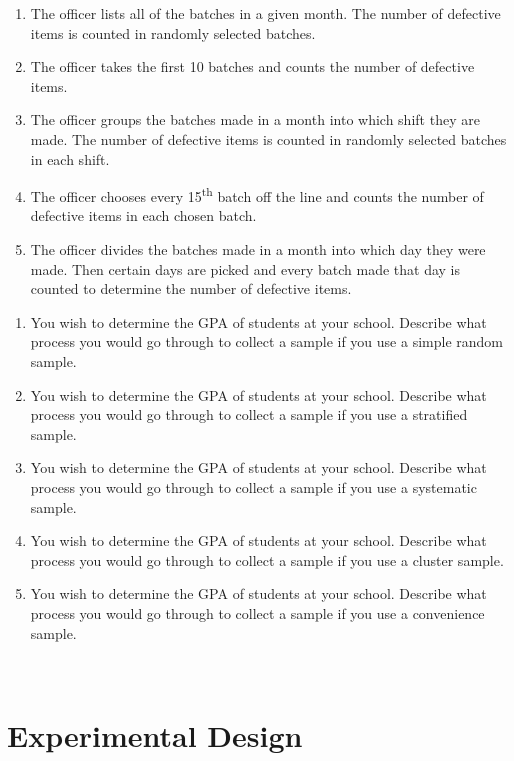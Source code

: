 \documentclass[]{book}
\providecommand{\tightlist}{%
  \setlength{\itemsep}{0pt}\setlength{\parskip}{0pt}}
\begin{document}
\begin{enumerate}
\def\labelenumi{\alph{enumi}.}
\tightlist
\item
  The officer lists all of the batches in a given month. The number of defective items is counted in randomly selected batches.
\item
  The officer takes the first 10 batches and counts the number of defective items.
\item
  The officer groups the batches made in a month into which shift they are made. The number of defective items is counted in randomly selected batches in each shift.
\item
  The officer chooses every 15\textsuperscript{th} batch off the line and counts the number of defective items in each chosen batch.
\item
  The officer divides the batches made in a month into which day they were made. Then certain days are picked and every batch made that day is counted to determine the number of defective items.
\end{enumerate}

\begin{enumerate}
\def\labelenumi{\arabic{enumi}.}
\setcounter{enumi}{2}
\item
  You wish to determine the GPA of students at your school. Describe what process you would go through to collect a sample if you use a simple random sample.
\item
  You wish to determine the GPA of students at your school. Describe what process you would go through to collect a sample if you use a stratified sample.
\item
  You wish to determine the GPA of students at your school. Describe what process you would go through to collect a sample if you use a systematic sample.
\item
  You wish to determine the GPA of students at your school. Describe what process you would go through to collect a sample if you use a cluster sample.
\item
  You wish to determine the GPA of students at your school. Describe what process you would go through to collect a sample if you use a convenience sample.
\end{enumerate}

\textbf{\\
}

\hypertarget{experimental-design}{%
\section{Experimental Design}\label{experimental-design}}
\end{document}

